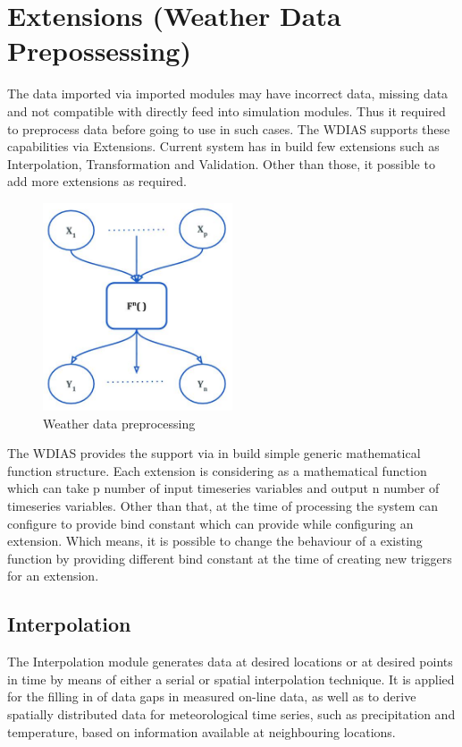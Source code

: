 \section{Extensions (Weather Data Prepossessing)}

The data imported via imported modules may have incorrect data, missing data and not compatible with directly feed into simulation modules. 
Thus it required to preprocess data before going to use in such cases. The WDIAS supports these capabilities via Extensions. Current system has
in build few extensions such as Interpolation, Transformation and Validation. Other than those, it possible to add more extensions as required.
\begin{figure}[htp]
    \centering
    \includegraphics[width=0.5\textwidth]{method/data_preprocess/weather_data_preprocessing.jpg}
    \caption{Weather data preprocessing}
    \label{fi:weather_data_preprocessing}
\end{figure}
The WDIAS provides the support via in build simple generic mathematical function structure. Each extension is considering as a mathematical function which can take p 
number of input timeseries variables and output n number of timeseries variables. Other than that, at the time of processing the system can configure to provide
bind constant which can provide while configuring an extension. Which means, it is possible to change the behaviour of a existing function by providing different bind
constant at the time of creating new triggers for an extension.

\subsection{Interpolation}
The Interpolation module generates data at desired locations or at desired points in time by means of either a serial or spatial interpolation technique. It is applied for the filling in of data gaps in measured on-line data, as well as to derive spatially distributed data for meteorological time series, such as precipitation and temperature, based on information available at neighbouring locations.

